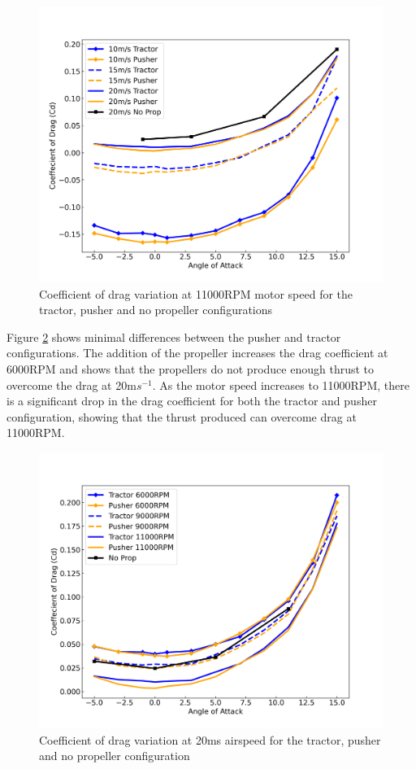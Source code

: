 \begin{figure}[H]
    \centering
    \includegraphics[scale = 0.7]{05_Results/Figs/Cd/110000RPM_Cd.png}
    \caption{Coefficient of drag variation at 11000RPM motor speed for the tractor, pusher and no propeller configurations}
    \label{fig:Cd_11000RPM}
\end{figure}

Figure \ref{fig:Cd_20ms} shows minimal differences between the pusher and tractor configurations. The addition of the propeller increases the drag coefficient at 6000RPM and shows that the propellers do not produce enough thrust to overcome the drag at 20m$s^{-1}$. As the motor speed increases to 11000RPM, there is a significant drop in the drag coefficient for both the tractor and pusher configuration, showing that the thrust produced can overcome drag at 11000RPM. 


\begin{figure}[H]
    \centering
    \includegraphics[scale = 0.7]{05_Results/Figs/Cd/20ms_Cd.png}
    \caption{Coefficient of drag variation at 20ms airspeed for the tractor, pusher and no propeller configuration}
    \label{fig:Cd_20ms}
\end{figure}



